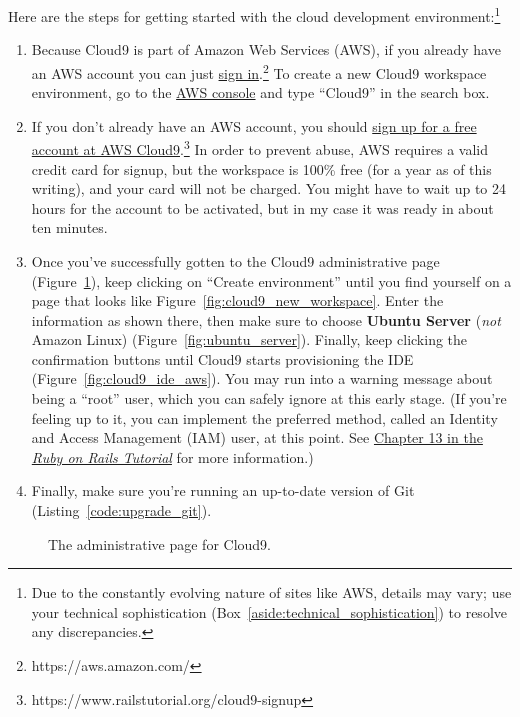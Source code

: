 Here are the steps for getting started with the cloud development environment:\footnote{Due to the constantly evolving nature of sites like AWS, details may vary; use your technical sophistication (Box~\ref{aside:technical_sophistication}) to resolve any discrepancies.}
\begin{enumerate}
\item Because Cloud9 is part of Amazon Web Services (AWS), if you already have an AWS account you can just \href{https://aws.amazon.com/}{sign in}.\footnote{https://aws.amazon.com/} To create a new Cloud9 workspace environment, go to the \href{https://console.aws.amazon.com/}{AWS console} and type ``Cloud9'' in the search box.
\item If you don't already have an AWS account, you should \href{https://www.railstutorial.org/cloud9-signup}{sign up for a free account at AWS Cloud9}.\footnote{https://www.railstutorial.org/cloud9-signup} In order to prevent abuse, AWS requires a valid credit card for signup, but the workspace is 100\% free (for a year as of this writing), and your card will not be charged. You might have to wait up to 24 hours for the account to be activated, but in my case it was ready in about ten minutes.
\item Once you've successfully gotten to the Cloud9 administrative page (Figure~\ref{fig:cloud9_page_aws}), keep clicking on ``Create environment'' until you find yourself on a page that looks like Figure~\ref{fig:cloud9_new_workspace}. Enter the information as shown there, then make sure to choose \textbf{Ubuntu Server} (\emph{not} Amazon Linux) (Figure~\ref{fig:ubuntu_server}). Finally, keep clicking the confirmation buttons until Cloud9 starts provisioning the IDE (Figure~\ref{fig:cloud9_ide_aws}). You may run into a warning message about being a ``root'' user, which you can safely ignore at this early stage. (If you're feeling up to it, you can implement the preferred method, called an Identity and Access Management (IAM) user, at this point. See \href{https://www.railstutorial.org/book/user_microposts#sec-image_upload_in_production}{Chapter 13 in the \href{https://www.railstutorial.org/}{\emph{Ruby on Rails Tutorial}}} for more information.)
\item Finally, make sure you're running an up-to-date version of Git (Listing~\ref{code:upgrade_git}).
\end{enumerate}

\begin{figure}
\begin{center}
\end{center}
\caption{The administrative page for Cloud9.\label{fig:cloud9_page_aws}}
\end{figure}

